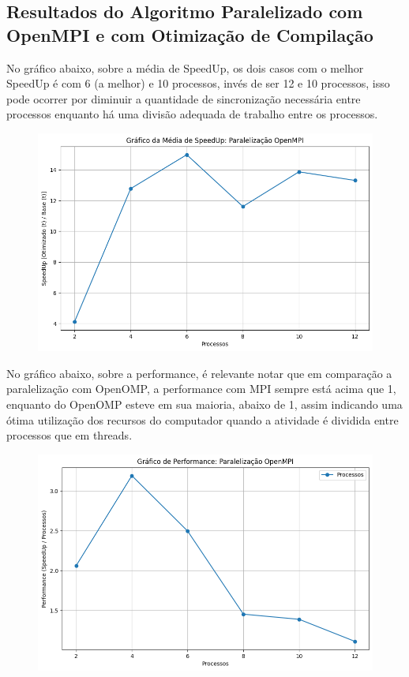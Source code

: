 \subsection{Resultados do Algoritmo Paralelizado com OpenMPI e com Otimização de Compilação}

No gráfico abaixo, sobre a média de SpeedUp, os dois casos com o melhor SpeedUp é com 6 (a melhor) e 10 processos, invés de ser 12 e 10 processos, isso pode ocorrer por diminuir a quantidade de sincronização necessária entre processos enquanto há uma divisão adequada de trabalho entre os processos.

\begin{figure}[H]
    \centering
    \includegraphics[width=1\linewidth]{../assets/MPI - SpeedUp.png}
\end{figure}

No gráfico abaixo, sobre a performance, é relevante notar que em comparação a paralelização com OpenOMP, a performance com MPI sempre está acima que 1, enquanto do OpenOMP esteve em sua maioria, abaixo de 1, assim indicando uma ótima utilização dos recursos do computador quando a atividade é dividida entre processos que em threads.

\begin{figure}[H]
    \centering
    \includegraphics[width=1\linewidth]{../assets/MPI - Performance.png}
\end{figure}

